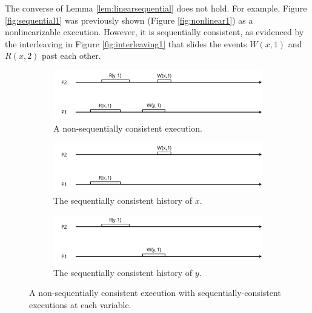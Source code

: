 \documentclass[]             %
{NASA}                       %
\theoremstyle{definition}
\begin{document}
The converse of Lemma \ref{lem:linearsequential} does not hold. For
example, Figure \ref{fig:sequential1} was previously shown (Figure
\ref{fig:nonlinear1}) as a nonlinearizable execution. However, it is
sequentially consistent, as evidenced by the interleaving in Figure
\ref{fig:interleaving1} that slides the events \(W(x,1)\) and \(R(x,2)\)
past each other.

\begin{figure}
     \begin{subfigure}[a]{1\textwidth}
         \center
         \includegraphics[scale=0.4]{images/nonsequential1.png}
         \caption{A non-sequentially consistent execution.}
         \label{fig:nonsequential1}
     \end{subfigure}
     \begin{subfigure}[b]{1\textwidth}
         \center
         \includegraphics[scale=0.4]{images/nonsequential_x.png}
         \caption{The sequentially consistent history of $x$.}
         \label{fig:sequentialx}
     \end{subfigure}
     \begin{subfigure}[b]{1\textwidth}
         \center
         \includegraphics[scale=0.4]{images/nonsequential_y.png}
         \caption{The sequentially consistent history of $y$.}
         \label{fig:sequentialy}
     \end{subfigure}
     \caption{A non-sequentially consistent execution with sequentially-consistent executions at each variable.}
     \label{fig:nonsequential}
\end{figure}
\end{document}
